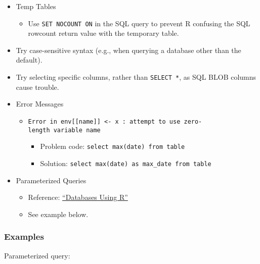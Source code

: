 \documentclass[
]{book}
\providecommand{\tightlist}{%
  \setlength{\itemsep}{0pt}\setlength{\parskip}{0pt}}
\begin{document}
\begin{itemize}
\tightlist
\item
  Temp Tables

  \begin{itemize}
  \tightlist
  \item
    Use \texttt{SET\ NOCOUNT\ ON} in the SQL query to prevent R confusing the SQL rowcount return value with the temporary table.
  \end{itemize}
\item
  Try case-sensitive syntax (e.g., when querying a database other than the default).
\item
  Try selecting specific columns, rather than \texttt{SELECT\ *}, as SQL BLOB columns cause trouble.
\item
  Error Messages

  \begin{itemize}
  \tightlist
  \item
    \texttt{Error\ in\ env{[}{[}name{]}{]}\ \textless{}-\ x\ :\ attempt\ to\ use\ zero-length\ variable\ name}

    \begin{itemize}
    \tightlist
    \item
      Problem code: \texttt{select\ max(date)\ from\ table}
    \item
      Solution: \texttt{select\ max(date)\ as\ max\_date\ from\ table}
    \end{itemize}
  \end{itemize}
\item
  Parameterized Queries

  \begin{itemize}
  \tightlist
  \item
    Reference: \href{https://db.rstudio.com/}{``Databases Using R''}
  \item
    See example below.
  \end{itemize}
\end{itemize}

\hypertarget{examples-2}{%
\subsubsection{Examples}\label{examples-2}}

Parameterized query:
\end{document}
